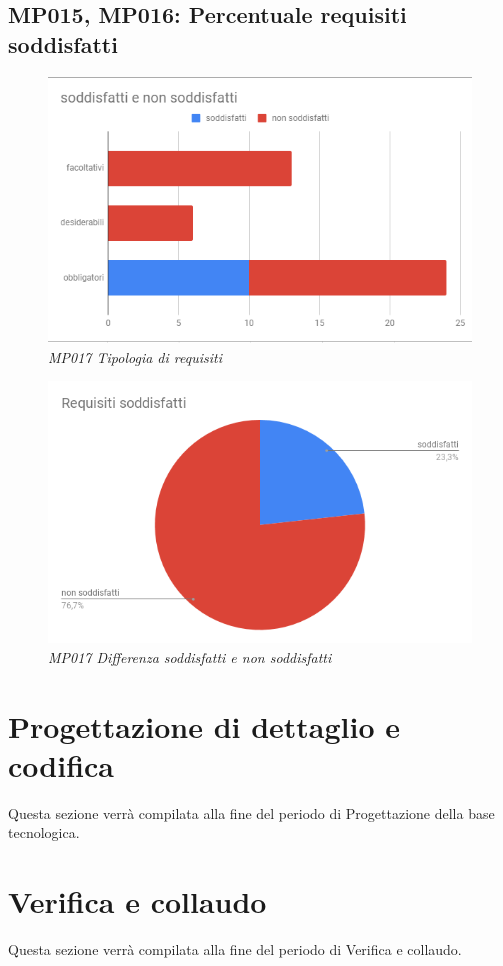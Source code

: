 \subsection{MP015, MP016: Percentuale requisiti soddisfatti}
\begin{figure} [h]
    \centering
	\includegraphics[scale=0.5]{./images/req.PNG}
    \caption{\textit{MP017 Tipologia di requisiti}}\label{}
\end{figure}
\begin{figure} [h]
    \centering
	\includegraphics[scale=0.5]{./images/RequisitiSoddisfatti.png}
    \caption{\textit{MP017 Differenza soddisfatti e non soddisfatti}}\label{}
\end{figure}

\newpage
\section{Progettazione di dettaglio e codifica}
Questa sezione verrà compilata alla fine del periodo di Progettazione della base tecnologica.
\section{Verifica e collaudo}
Questa sezione verrà compilata alla fine del periodo di Verifica e collaudo.